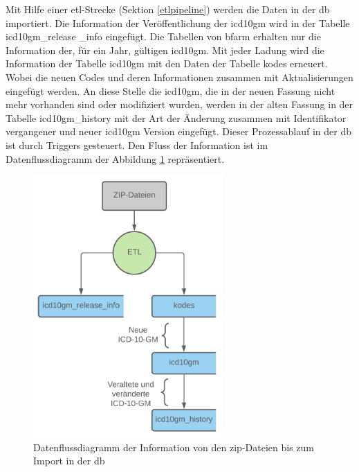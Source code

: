 Mit Hilfe einer \ac{etl}-Strecke (Sektion \ref{etlpipeline}) werden die Daten in der \ac{db} importiert. Die Information der Veröffentlichung der \ac{icd10gm} wird in der Tabelle {\ttfamily icd10gm\_release \_info} eingefügt. Die Tabellen von \ac{bfarm} erhalten nur die Information der, für ein Jahr, gültigen \ac{icd10gm}. Mit jeder Ladung wird die Information der Tabelle {\ttfamily icd10gm} mit den Daten der Tabelle {\ttfamily kodes} erneuert. Wobei die neuen Codes und deren Informationen zusammen mit Aktualisierungen eingefügt werden. An diese Stelle die \ac{icd10gm}, die in der neuen Fassung nicht mehr vorhanden sind oder modifiziert wurden, werden in der alten Fassung in der Tabelle {\ttfamily icd10gm\_history} mit der Art der Änderung zusammen mit Identifikator vergangener und neuer \ac{icd10gm} Version eingefügt. Dieser Prozessablauf in der \ac{db} ist durch Triggers gesteuert. Den Fluss der Information ist im Datenflussdiagramm der Abbildung \ref{fig:dbflow} repräsentiert.

\begin{figure}[ht]
	\centering
	\includegraphics[height=10cm]{figures/dbflow}
	\caption[Datenfluss des Prozesses]{Datenflussdiagramm der Information von den \ac{zip}-Dateien bis zum Import in der \ac{db}}
	\label{fig:dbflow}
\end{figure} 